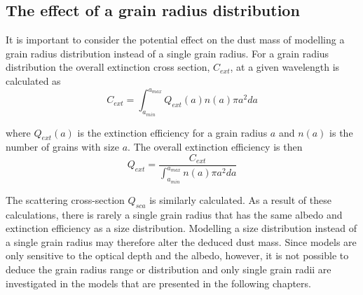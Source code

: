 %
%



\subsection{The effect of a grain radius distribution}
\label{gs_distn}
It is important to consider the potential effect on the dust mass of modelling a grain radius distribution instead of a single grain radius.  For a grain radius distribution the overall extinction cross section, $C_{ext}$, at a given wavelength is calculated as
\begin{equation}
C_{ext}=\int^{a_{max}}_{a_{min}} Q_{ext}(a) n(a) \pi a^2 da 
\end{equation}

where $Q_{ext}(a)$ is the extinction efficiency for a grain radius $a$ and $n(a)$ is the number of grains with size $a$. The overall extinction efficiency is then
\begin{equation} 
Q_{ext} = \frac{C_{ext}}{ \int^{a_{max}}_{a_{min}} n(a) \pi a^2 da} 
\end{equation}
 
The scattering cross-section $Q_{sca}$ is similarly calculated.  As a result of these calculations, there is rarely a single grain radius that has the same albedo and extinction efficiency as a size distribution.  Modelling a size distribution instead of a single grain radius may therefore alter the deduced dust mass.  Since models are only sensitive to the optical depth and the albedo, however, it is not possible to deduce the grain radius range or distribution and only single grain radii are investigated in the models that are presented in the following chapters.

